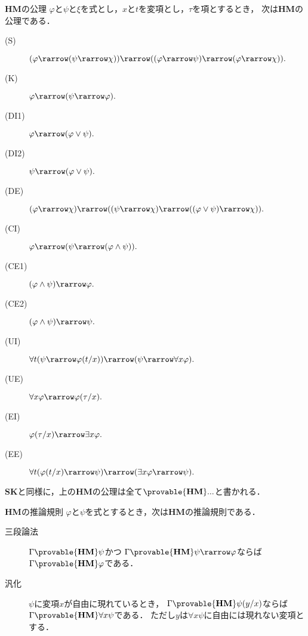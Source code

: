 	\begin{itembox}[l]{{\bf HM}の公理}
		$\varphi$と$\psi$と$\xi$を式とし，$x$と$t$を変項とし，$\tau$を項とするとき，
		次は{\bf HM}の公理である．
		\begin{description}
			\item[(S)] $(\varphi \rarrow (\psi \rarrow \chi)) 
				\rarrow ((\varphi \rarrow \psi)
				\rarrow (\varphi \rarrow \chi)).$
			\item[(K)] $\varphi \rarrow (\psi \rarrow \varphi).$
			\item[(DI1)] $\varphi \rarrow (\varphi \vee \psi).$
			\item[(DI2)] $\psi \rarrow (\varphi \vee \psi).$
			\item[(DE)] $(\varphi \rarrow \chi) \rarrow 
				((\psi \rarrow \chi) \rarrow ((\varphi \vee \psi) \rarrow \chi)).$
			\item[(CI)] $\varphi \rarrow (\psi \rarrow (\varphi \wedge \psi)).$
			\item[(CE1)] $(\varphi \wedge \psi) \rarrow \varphi.$
			\item[(CE2)] $(\varphi \wedge \psi) \rarrow \psi.$
			\item[(UI)] $\forall t (\psi \rarrow \varphi(t/x)) 
				\rarrow (\psi \rarrow \forall x \varphi).$
			\item[(UE)] $\forall x \varphi \rarrow \varphi(\tau/x).$
			\item[(EI)] $\varphi(\tau/x) \rarrow \exists x \varphi.$
			\item[(EE)] $\forall t (\varphi(t/x) \rarrow \psi)
				\rarrow (\exists x \varphi \rarrow \psi).$
		\end{description}
	\end{itembox}
	
	{\bf SK}と同様に，上の{\bf HM}の公理は全て$\provable{\mbox{{\bf HM}}} ...$と書かれる．
	
	\begin{itembox}[l]{{\bf HM}の推論規則}
		$\varphi$と$\psi$を式とするとき，次は{\bf HM}の推論規則である．
		\begin{description}
			\item[三段論法] $\Gamma \provable{\mbox{{\bf HM}}} \psi$かつ
				$\Gamma \provable{\mbox{{\bf HM}}} \psi \rarrow \varphi$ならば
				$\Gamma \provable{\mbox{{\bf HM}}} \varphi$である．
			\item[汎化] $\psi$に変項$x$が自由に現れているとき，
				$\Gamma \provable{\mbox{{\bf HM}}} \psi(y/x)$ならば
				$\Gamma \provable{\mbox{{\bf HM}}} \forall x \psi$である．
				ただし$y$は$\forall x \psi$に自由には現れない変項とする．
		\end{description}
	\end{itembox}
	
